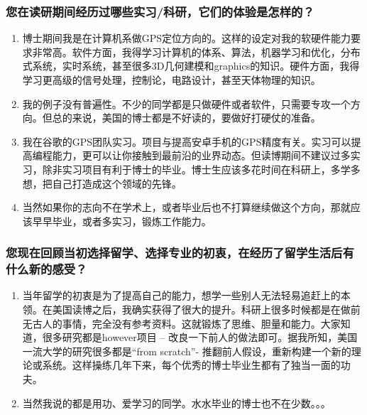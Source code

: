 \documentclass[a4paper,UTF8]{book}
\begin{document}
    \subsubsection*{您在读研期间经历过哪些实习/科研，它们的体验是怎样的？}
        \begin{enumerate}[itemindent=0pt,itemsep=0pt,parsep=0pt]
            \item 博士期间我是在计算机系做GPS定位方向的。这样的设定对我的软硬件能力要求非常高。软件方面，我得学习计算机的体系、算法，机器学习和优化，分布式系统，实时系统，甚至很多3D几何建模和graphics的知识。硬件方面，我得学习更高级的信号处理，控制论，电路设计，甚至天体物理的知识。
            \item 我的例子没有普遍性。不少的同学都是只做硬件或者软件，只需要专攻一个方向。但总的来说，美国的博士都是不好读的，要做好打硬仗的准备。
            \item 我在谷歌的GPS团队实习。项目与提高安卓手机的GPS精度有关。实习可以提高编程能力，更可以让你接触到最前沿的业界动态。但读博期间不建议过多实习，除非实习项目有利于博士的毕业。博士生应该多花时间在科研上，多学多想，把自己打造成这个领域的先锋。
            \item 当然如果你的志向不在学术上，或者毕业后也不打算继续做这个方向，那就应该早早毕业，或者多实习，锻炼工作能力。
        \end{enumerate}
    \subsubsection*{您现在回顾当初选择留学、选择专业的初衷，在经历了留学生活后有什么新的感受？}
        \begin{enumerate}[itemindent=0pt,itemsep=0pt,parsep=0pt]
            \item 当年留学的初衷是为了提高自己的能力，想学一些别人无法轻易追赶上的本领。在美国读博之后，我确实获得了很大的提升。科研上很多时候都是在做前无古人的事情，完全没有参考资料。这就锻炼了思维、胆量和能力。大家知道，很多研究都是however项目 – 改良一下前人的做法即可。据我所知，美国一流大学的研究很多都是“from scratch”- 推翻前人假设，重新构建一个新的理论或系统。这样操练几年下来，每个优秀的博士毕业生都有了独当一面的功夫。
            \item 当然我说的都是用功、爱学习的同学。水水毕业的博士也不在少数。。。
        \end{enumerate}
\end{document}
